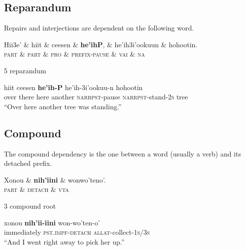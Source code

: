 \documentclass{handout}
\begin{document}
\begin{multicols}{2}
\subsection{Reparandum}
\footnotesize
\begin{exe}
\ex \label{repair} Repairs and interjections are dependent on the following word.\\%
\begin{dependency}
\begin{deptext}
 Hii3e' \& hiit \& ceesen \& \textbf{he'ihP}, \& he'ih3i'ookuun \& hohootin.\\
 \textsc{part} \& \textsc{part} \& \textsc{pro} \& \textsc{prefix-pause} \& \textsc{vai} \& \textsc{na}\\
\end{deptext}
	{5}	{reparandum}
\end{dependency}
 hiit {ceesen} \textbf{he'ih-P} he'ih-3i'ookuu-n hohootin\\
 {over there} here {another} \textsc{narrpst}-pause \textsc{narrpst}-stand-\textsc{2s} tree\\
 \trans ``Over here another tree was standing.''
\end{exe}
\subsection{Compound}
\footnotesize
\begin{exe}
\ex \label{compound} The compound dependency is the one between a word (usually a verb) and its detached prefix.\\%
\begin{dependency}
\begin{deptext}
Xonou \& \textbf{nih'iini} \& wonwo'teno'.\\
\textsc{part} \& \textsc{detach} \& \textsc{vta}\\
\end{deptext}
	{3}	{compound}
	{root}
\end{dependency}
\gll  xonou \textbf{nih'ii-iini} {won-wo'ten-o'}\\
 immediately \textsc{pst.impf-detach} {\textsc{allat}-collect-\textsc{1s/3s}}\\
 \trans ``And I went right away to pick her up.''
 \end{exe}
 

\end{multicols}
\end{document}

